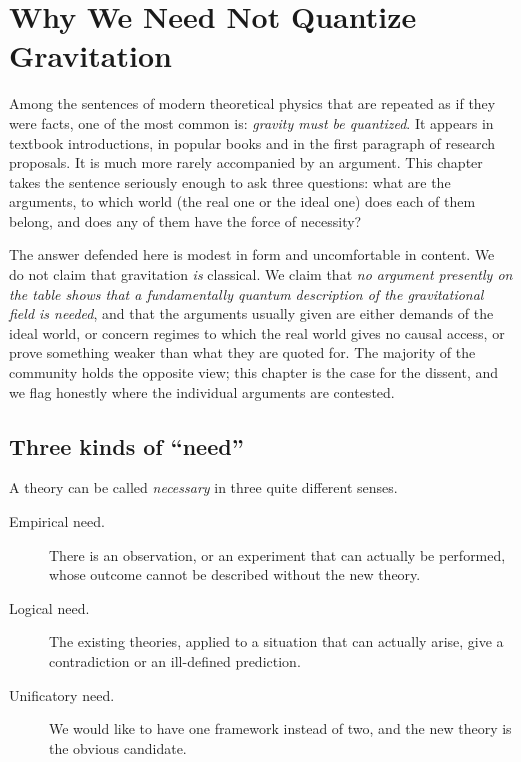 %

\chapter{Why We Need Not Quantize Gravitation}
\label{ch:no-quantum-gravitation}

Among the sentences of modern theoretical physics that are repeated as
if they were facts, one of the most common is: \emph{gravity must be
quantized}. It appears in textbook introductions, in popular books and in
the first paragraph of research proposals. It is much more rarely
accompanied by an argument. This chapter takes the sentence seriously
enough to ask three questions: what are the arguments, to which world
(the real one or the ideal one) does each of them belong, and does any
of them have the force of necessity?

The answer defended here is modest in form and uncomfortable in content.
We do not claim that gravitation \emph{is} classical. We claim that
\emph{no argument presently on the table shows that a fundamentally quantum
description of the gravitational field is needed}, and that the arguments
usually given are either demands of the ideal world, or concern regimes
to which the real world gives no causal access, or prove something weaker
than what they are quoted for. The majority of the community holds the
opposite view; this chapter is the case for the dissent, and we flag
honestly where the individual arguments are contested.

\section{Three kinds of ``need''}

A theory can be called \emph{necessary} in three quite different senses.

\begin{description}
\item[Empirical need.] There is an observation, or an experiment that can
  actually be performed, whose outcome cannot be described without the
  new theory.
\item[Logical need.] The existing theories, applied to a situation that can
  actually arise, give a contradiction or an ill-defined prediction.
\item[Unificatory need.] We would like to have one framework instead of
  two, and the new theory is the obvious candidate.
\end{description}

